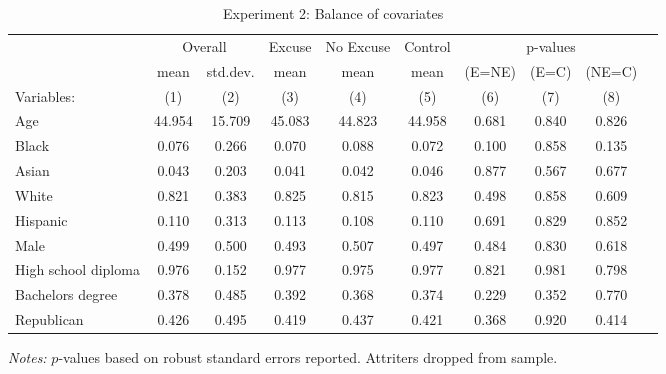 \begin{table}[!ht]
\centering
\caption{Experiment 2: Balance of covariates}
\label{t:2-balance}
\vspace*{2mm}
\begin{threeparttable}
\begin{tabular}{lccccccccc}
\toprule
 & \multicolumn{2}{c}{Overall} & Excuse & No Excuse & Control & \multicolumn{3}{c}{p-values} \\
 \cmidrule(r){2-3} \cmidrule(lr){4-4} \cmidrule(lr){5-5} \cmidrule(lr){6-6} \cmidrule(lr){7-9} 
 & mean & std.dev. & mean & mean & mean & (E=NE) & (E=C) & (NE=C) \\
 \cmidrule(r){2-2} \cmidrule(lr){3-3} \cmidrule(lr){4-4} \cmidrule(lr){5-5} \cmidrule(l){6-6} \cmidrule(l){7-7} \cmidrule(l){8-8} \cmidrule(l){9-9}  
  Variables: & (1) & (2) & (3) & (4) & (5) & (6) & (7) & (8) \\ \midrule \midrule
Age & 44.954 & 15.709 & 45.083 & 44.823 & 44.958 & 0.681 & 0.840 & 0.826 \\
\addlinespace
Black & 0.076 & 0.266 & 0.070 & 0.088 & 0.072 & 0.100 & 0.858 & 0.135 \\
Asian & 0.043 & 0.203 & 0.041 & 0.042 & 0.046 & 0.877 & 0.567 & 0.677 \\
White & 0.821 & 0.383 & 0.825 & 0.815 & 0.823 & 0.498 & 0.858 & 0.609 \\
Hispanic & 0.110 & 0.313 & 0.113 & 0.108 & 0.110 & 0.691 & 0.829 & 0.852 \\
\addlinespace
Male & 0.499 & 0.500 & 0.493 & 0.507 & 0.497 & 0.484 & 0.830 & 0.618 \\
\addlinespace
High school diploma & 0.976 & 0.152 & 0.977 & 0.975 & 0.977 & 0.821 & 0.981 & 0.798 \\
Bachelors degree & 0.378 & 0.485 & 0.392 & 0.368 & 0.374 & 0.229 & 0.352 & 0.770 \\
\addlinespace
Republican & 0.426 & 0.495 & 0.419 & 0.437 & 0.421 & 0.368 & 0.920 & 0.414 \\
 \midrule
\bottomrule
\end{tabular}
\begin{tablenotes}[flushleft] \footnotesize
\item \textit{Notes: }$p$-values based on robust standard errors reported. Attriters dropped from sample.
\end{tablenotes} \end{threeparttable} \end{table}
